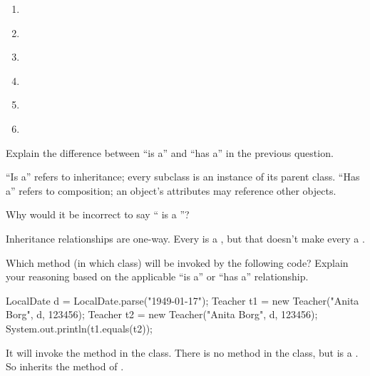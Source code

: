 \begin{multicols}{2}
\begin{enumerate}
\item {}  ~

\item {}  ~

\item {}  ~

\item {}  ~

\item {}  ~

\item {}  ~
\end{enumerate}
\end{multicols}


\Q \label{key1}
Explain the difference between ``is a'' and ``has a'' in the previous question.

\begin{answer}
``Is a'' refers to inheritance; every subclass is an instance of its parent class.
``Has a'' refers to composition; an object's attributes may reference other objects.
\end{answer}


\Q \label{NotStu}
Why would it be incorrect to say `` is a ''?

\begin{answer}
Inheritance relationships are one-way.
Every  is a , but that doesn't make every  a .
\end{answer}


\Q Which  method (in which class) will be invoked by the following code?
Explain your reasoning based on the applicable ``is a'' or ``has a'' relationship.

\begin{javalst}
LocalDate d = LocalDate.parse("1949-01-17");
Teacher t1 = new Teacher("Anita Borg", d, 123456);
Teacher t2 = new Teacher("Anita Borg", d, 123456);
System.out.println(t1.equals(t2));
\end{javalst}

\begin{answer}
It will invoke the  method in the  class.
There is no  method in the  class, but  is a .
So  inherits the  method of .
\end{answer}
